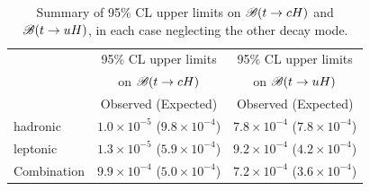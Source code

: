 \begin{table}[t!]
\caption{\small{Summary of 95\% CL upper limits on $\mathscr{B}(t \to cH)$ and $\mathscr{B}(t \to uH)$, in each case neglecting the other decay mode. }}
\begin{center}
\begin{tabular}{lcc}
\toprule\toprule
 & \multicolumn{1}{c}{95\% CL upper limits} & \multicolumn{1}{c}{95\% CL upper limits}  \\
 & \multicolumn{1}{c}{on $\mathscr{B}(t \to cH)$} & \multicolumn{1}{c}{on $\mathscr{B}(t \to uH)$} \\
 &  Observed (Expected) & Observed (Expected)  \\
\midrule\midrule
hadronic  & $1.0 \times 10^{-5}$ ($9.8 \times 10^{-4}$) & $7.8 \times 10^{-4}$ ($7.8 \times 10^{-4}$) \\ 
leptonic  & $1.3 \times 10^{-5}$ ($5.9 \times 10^{-4}$) & $9.2 \times 10^{-4}$ ($4.2 \times 10^{-4}$) \\
\midrule
Combination  & $9.9 \times 10^{-4}$ ($5.0 \times 10^{-4}$) & $7.2 \times 10^{-4}$ ($3.6 \times 10^{-4}$) \\
\bottomrule\bottomrule
\end{tabular}
\label{tab:limits_summary}
\end{center}
\end{table}

